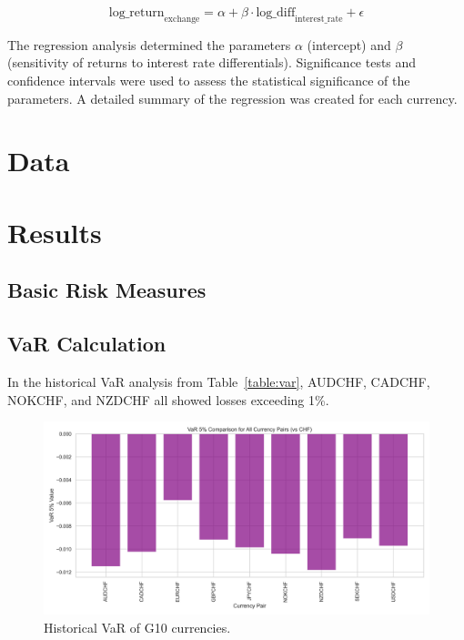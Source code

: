 \documentclass{article}
\begin{document}
\[
\text{log\_return}_{\text{exchange}} = \alpha + \beta \cdot \text{log\_diff}_{\text{interest\_rate}} + \epsilon
\]

The regression analysis determined the parameters \(\alpha\) (intercept) and \(\beta\) (sensitivity of returns to interest rate differentials). Significance tests and confidence intervals were used to assess the statistical significance of the parameters. A detailed summary of the regression was created for each currency.

\section{Data}


\section{Results}
\subsection{Basic Risk Measures}

\subsection{VaR Calculation}
In the historical VaR analysis from Table~\ref{table:var}, AUDCHF, CADCHF, NOKCHF, and NZDCHF all showed losses exceeding 1\%. 

\begin{figure}[h]
    \centering
    \includegraphics[width=0.75\linewidth]{reports/figures/var_5_percent_comparison_plot.png}
    \caption{Historical VaR of G10 currencies.}
    \label{fig:historical_VaR}
\end{figure}
\end{document}

